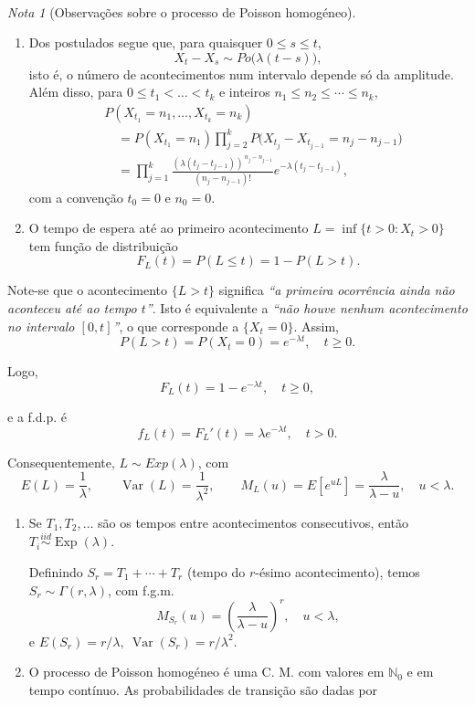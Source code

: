 \documentclass[
  11pt,
  a4paper,
]{book}
\theoremstyle{definition}
\theoremstyle{definition}
\theoremstyle{definition}
\theoremstyle{definition}
\theoremstyle{remark}
\newtheorem*{remark}{Nota }
\begin{document}
\(\,\)

\begin{remark}[Observações sobre o processo de Poisson homogéneo]
\leavevmode

\begin{enumerate}
\def\labelenumi{\arabic{enumi}.}
\item
  Dos postulados segue que, para quaisquer \(0\le s\le t\),
  \[
  X_t-X_s \sim Po\big(\lambda (t-s)\big),
  \]
  isto é, o número de acontecimentos num intervalo depende só da amplitude. Além disso, para \(0\le t_1<\dots<t_k\) e inteiros \(n_1\le n_2\le\cdots\le n_k\),
  \[
  \begin{aligned}
  &P(X_{t_1}=n_1,\dots,X_{t_k}=n_k) \\
  &\quad= P(X_{t_1}=n_1)\prod_{j=2}^k P\big(X_{t_j}-X_{t_{j-1}}=n_j-n_{j-1}\big)\\
  &\quad= \prod_{j=1}^k \frac{(\lambda (t_j-t_{j-1}))^{\,n_j-n_{j-1}}}{(n_j-n_{j-1})!} e^{-\lambda (t_j-t_{j-1})},
  \end{aligned}
  \]
  com a convenção \(t_0=0\) e \(n_0=0\).
\item
  O tempo de espera até ao primeiro acontecimento \(L=\inf\{t>0: X_t>0\}\) tem função de distribuição
  \[
  F_L(t)=P(L\leq t)=1-P(L>t).
  \]
\end{enumerate}

Note-se que o acontecimento \(\{L>t\}\) significa \emph{``a primeira ocorrência ainda não aconteceu até ao tempo \(t\)''}. Isto é equivalente a \emph{``não houve nenhum acontecimento no intervalo \([0,t]\)''}, o que corresponde a \(\{X_t=0\}\). Assim,
\[
P(L>t)=P(X_t=0)=e^{-\lambda t},\quad t\ge0.
\]

Logo,
\[
F_L(t)=1-e^{-\lambda t},\quad t\ge0,
\]

e a f.d.p. é
\[
f_L(t)=F_L'(t)=\lambda e^{-\lambda t},\quad t>0.
\]

Consequentemente, \(L\sim Exp(\lambda)\), com
\[
E(L)=\frac{1}{\lambda}, \qquad \operatorname{Var}(L)=\frac{1}{\lambda^2}, \qquad M_L(u)=E[e^{uL}]=\frac{\lambda}{\lambda-u}, \quad u<\lambda.
\]

\begin{enumerate}
\def\labelenumi{\arabic{enumi}.}
\setcounter{enumi}{2}
\item
  Se \(T_1,T_2,\dots\) são os tempos entre acontecimentos consecutivos, então \(T_i\stackrel{iid}{\sim}\operatorname{Exp}(\lambda)\).

  Definindo \(S_r=T_1+\cdots+T_r\) (tempo do \(r\)-ésimo acontecimento), temos \(S_r\sim \Gamma(r,\lambda)\), com f.g.m.
  \[
  M_{S_r}(u)=\left(\frac{\lambda}{\lambda-u}\right)^r,\quad u<\lambda,
  \]
  e \(E(S_r)=r/\lambda,\ \operatorname{Var}(S_r)=r/\lambda^2\).
\item
  O processo de Poisson homogéneo é uma C. M. com valores em \(\mathbb{N}_0\) e em tempo contínuo. As probabilidades de transição são dadas por


\end{enumerate}
\end{remark}
\end{document}
